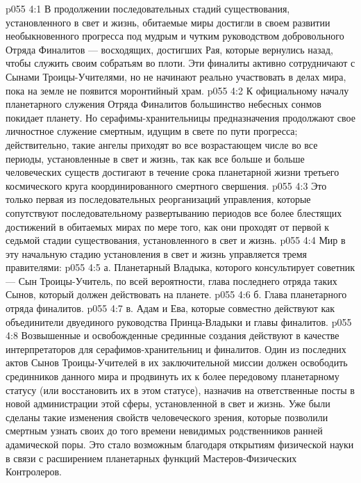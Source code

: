 \vs p055 4:1 В продолжении последовательных стадий существования, установленного в свет и жизнь, обитаемые миры достигли в своем развитии необыкновенного прогресса под мудрым и чутким руководством добровольного Отряда Финалитов --- восходящих, достигших Рая, которые вернулись назад, чтобы служить своим собратьям во плоти. Эти финалиты активно сотрудничают с Сынами Троицы\hyp{}Учителями, но не начинают реально участвовать в делах мира, пока на земле не появится моронтийный храм.
\vs p055 4:2 К официальному началу планетарного служения Отряда Финалитов большинство небесных сонмов покидает планету. Но серафимы\hyp{}хранительницы предназначения продолжают свое личностное служение смертным, идущим в свете по пути прогресса; действительно, такие ангелы приходят во все возрастающем числе во все периоды, установленные в свет и жизнь, так как все больше и больше человеческих существ достигают в течение срока планетарной жизни третьего космического круга координированного смертного свершения.
\vs p055 4:3 Это только первая из последовательных реорганизаций управления, которые сопутствуют последовательному развертыванию периодов все более блестящих достижений в обитаемых мирах по мере того, как они проходят от первой к седьмой стадии существования, установленного в свет и жизнь.
\vs p055 4:4 \pc {}\bibnobreakspace {} Мир в эту начальную стадию установления в свет и жизнь управляется тремя правителями:
\vs p055 4:5 а. Планетарный Владыка, которого консультирует советник --- Сын Троицы\hyp{}Учитель, по всей вероятности, глава последнего отряда таких Сынов, который должен действовать на планете.
\vs p055 4:6 б. Глава планетарного отряда финалитов.
\vs p055 4:7 в. Адам и Ева, которые совместно действуют как объединители двуединого руководства Принца\hyp{}Владыки и главы финалитов.
\vs p055 4:8 \pc Возвышенные и освобожденные срединные создания действуют в качестве интерпретаторов для серафимов\hyp{}хранительниц и финалитов. Один из последних актов Сынов Троицы\hyp{}Учителей в их заключительной миссии должен освободить срединников данного мира и продвинуть их к более передовому планетарному статусу (или восстановить их в этом статусе), назначив на ответственные посты в новой администрации этой сферы, установленной в свет и жизнь. Уже были сделаны такие изменения свойств человеческого зрения, которые позволили смертным узнать своих до того времени невидимых родственников ранней адамической поры. Это стало возможным благодаря открытиям физической науки в связи с расширением планетарных функций Мастеров\hyp{}Физических Контролеров.

